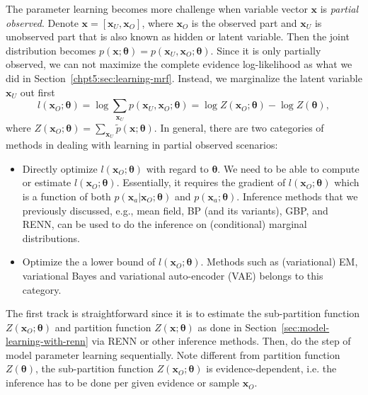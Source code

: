 The parameter learning becomes more challenge when variable vector $\bm{x}$ is \textit{partial observed}. Denote $\bm{x} = [\bm{x}_U, \bm{x}_O]$, where $\bm{x}_O$ is the observed part and $\bm{x}_U$ is unobserved part that is also known as hidden or latent variable. Then the joint distribution becomes $p(\bm{x}; \bm{\theta}) = p(\bm{x}_U, \bm{x}_O; \bm{\theta})$. Since it is only partially observed, we can not maximize the complete evidence log-likelihood as what we did in Section~\ref{chpt5:sec:learning-mrf}. Instead, we marginalize the latent variable $\bm{x}_U$ out first
\begin{equation}\label{chpt5:eq:patial-likelihood}
  l(\bm{x}_O; \bm{\theta}) = \log{\sum_{\bm{x}_U}p(\bm{x}_U, \bm{x}_O; \bm{\theta})} = \log{Z(\bm{x}_O;\bm{\theta})} - \log{Z(\bm{\theta})},
\end{equation}
where $Z(\bm{x}_O;\bm{\theta}) = \sum_{\bm{x}_U}\tilde{p}(\bm{x}; \bm{\theta})$. In general, there are two categories of methods in dealing with learning in partial observed scenarios:
\begin{itemize}
\item Directly optimize $l(\bm{x}_O; \bm{\theta})$ with regard to $\bm{\theta}$. We need to be able to compute or estimate $l(\bm{x}_O; \bm{\theta})$. Essentially, it requires the gradient of $l(\bm{x}_O; \bm{\theta})$ which is a function of both $p(\bm{x}_a| \bm{x}_O; \bm{\theta})$ and $p(\bm{x}_a; \bm{\theta})$. Inference methods that we previously discussed, e.g., mean field, BP (and its variants), GBP, and RENN, can be used to do the inference on (conditional) marginal distributions.
\item Optimize the a lower bound of $l(\bm{x}_O; \bm{\theta})$. Methods such as (variational) EM, variational Bayes and variational auto-encoder (VAE) \cite{kingma2019vae} belongs to this category.
\end{itemize}

The first track is straightforward since it is to estimate the sub-partition function $Z(\bm{x}_O; \bm{\theta})$ and partition function $Z(\bm{x}; \bm{\theta})$ as done in Section~\ref{sec:model-learning-with-renn} via RENN or other inference methods. Then, do the step of model parameter learning sequentially. Note different from partition function $Z(\bm{\theta})$, the sub-partition function $Z(\bm{x}_O; \bm{\theta})$ is evidence-dependent, i.e. the inference has to be done per given evidence or sample  $\bm{x}_O$. 

